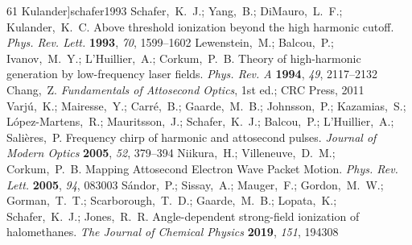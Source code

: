 \documentclass[journal=jacsat,manuscript=article]{achemso}
\begin{document}
\begin{mcitethebibliography}{61}
  Kulander]{schafer1993}
Schafer,~K.~J.; Yang,~B.; DiMauro,~L.~F.; Kulander,~K.~C. Above threshold
  ionization beyond the high harmonic cutoff. \emph{Phys. Rev. Lett.}
  \textbf{1993}, \emph{70}, 1599--1602\relax
\mciteBstWouldAddEndPuncttrue
\mciteSetBstMidEndSepPunct{\mcitedefaultmidpunct}
{\mcitedefaultendpunct}{\mcitedefaultseppunct}\relax
\EndOfBibitem
{}
Lewenstein,~M.; Balcou,~P.; Ivanov,~M.~Y.; L'Huillier,~A.; Corkum,~P.~B. Theory
  of high-harmonic generation by low-frequency laser fields. \emph{Phys. Rev.
  A} \textbf{1994}, \emph{49}, 2117--2132\relax
\mciteBstWouldAddEndPuncttrue
\mciteSetBstMidEndSepPunct{\mcitedefaultmidpunct}
{\mcitedefaultendpunct}{\mcitedefaultseppunct}\relax
\EndOfBibitem
{}
Chang,~Z. \emph{Fundamentals of Attosecond Optics}, 1st ed.; CRC Press,
  2011\relax
\mciteBstWouldAddEndPuncttrue
\mciteSetBstMidEndSepPunct{\mcitedefaultmidpunct}
{\mcitedefaultendpunct}{\mcitedefaultseppunct}\relax
\EndOfBibitem
{}
Varj\'{u},~K.; Mairesse,~Y.; Carr\'{e},~B.; Gaarde,~M.~B.; Johnsson,~P.;
  Kazamias,~S.; L\'{o}pez-Martens,~R.; Mauritsson,~J.; Schafer,~K.~J.;
  Balcou,~P.; L'Huillier,~A.; Salières,~P. Frequency chirp of harmonic and
  attosecond pulses. \emph{Journal of Modern Optics} \textbf{2005}, \emph{52},
  379--394\relax
\mciteBstWouldAddEndPuncttrue
\mciteSetBstMidEndSepPunct{\mcitedefaultmidpunct}
{\mcitedefaultendpunct}{\mcitedefaultseppunct}\relax
\EndOfBibitem
{}
Niikura,~H.; Villeneuve,~D.~M.; Corkum,~P.~B. Mapping Attosecond Electron Wave
  Packet Motion. \emph{Phys. Rev. Lett.} \textbf{2005}, \emph{94}, 083003\relax
\mciteBstWouldAddEndPuncttrue
\mciteSetBstMidEndSepPunct{\mcitedefaultmidpunct}
{\mcitedefaultendpunct}{\mcitedefaultseppunct}\relax
\EndOfBibitem
{}
S\'{a}ndor,~P.; Sissay,~A.; Mauger,~F.; Gordon,~M.~W.; Gorman,~T.~T.;
  Scarborough,~T.~D.; Gaarde,~M.~B.; Lopata,~K.; Schafer,~K.~J.; Jones,~R.~R.
  Angle-dependent strong-field ionization of halomethanes. \emph{The Journal of
  Chemical Physics} \textbf{2019}, \emph{151}, 194308\relax
\mciteBstWouldAddEndPuncttrue
\mciteSetBstMidEndSepPunct{\mcitedefaultmidpunct}

\end{mcitethebibliography}
\end{document}
